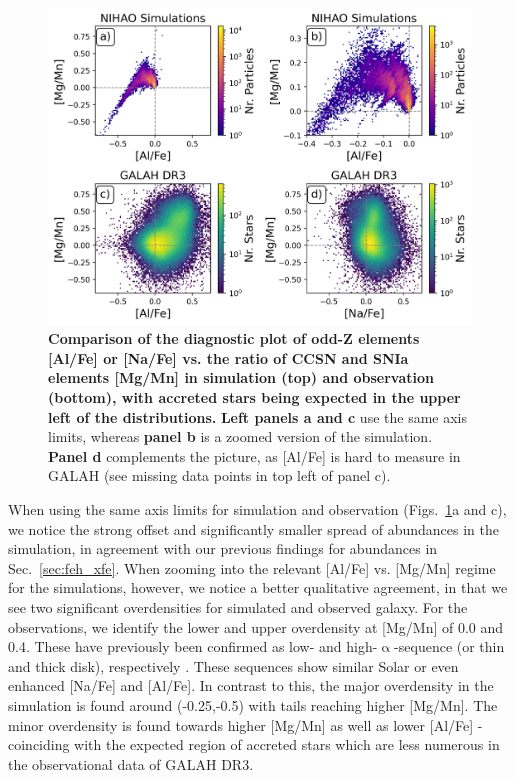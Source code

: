 \documentclass[fleqn,usenatbib]{mnras}
\begin{document}
\begin{figure}
	\includegraphics[width=\columnwidth]{figures/mgmn_alfe.png}
    \caption{
    \textbf{Comparison of the diagnostic plot of odd-Z elements [Al/Fe] or [Na/Fe] vs. the ratio of CCSN and SNIa elements [Mg/Mn] in simulation (top) and observation (bottom), with accreted stars being expected in the upper left of the distributions.}
    \textbf{Left panels a and c} use the same axis limits, whereas \textbf{panel b} is a zoomed version of the simulation. \textbf{Panel d} complements the picture, as [Al/Fe] is hard to measure in GALAH (see missing data points in top left of panel c).
    }
    \label{fig:NaFe_MgMn_selection_Age_FeH_dissection}
\end{figure}

When using the same axis limits for simulation and observation (Figs.~\ref{fig:NaFe_MgMn_selection_Age_FeH_dissection}a and c), we notice the strong offset and significantly smaller spread of abundances in the simulation, in agreement with our previous findings for abundances in Sec.~\ref{sec:feh_xfe}. When zooming into the relevant [Al/Fe] vs. [Mg/Mn] regime for the simulations, however, we notice a better qualitative agreement, in that we see two significant overdensities for simulated and observed galaxy. For the observations, we identify the lower and upper overdensity at [Mg/Mn] of 0.0 and 0.4. These have previously been confirmed as low- and high-$\upalpha$-sequence (or thin and thick disk), respectively \citep{Hawkins2015, Buder2022}. These sequences show similar Solar or even enhanced [Na/Fe] and [Al/Fe]. In contrast to this, the major overdensity in the simulation is found around (-0.25,-0.5) with tails reaching higher [Mg/Mn]. The minor overdensity is found towards higher [Mg/Mn] as well as lower [Al/Fe] - coinciding with the expected region of accreted stars \citep{Horta2021} which are less numerous in the observational data of GALAH DR3.
\end{document}
